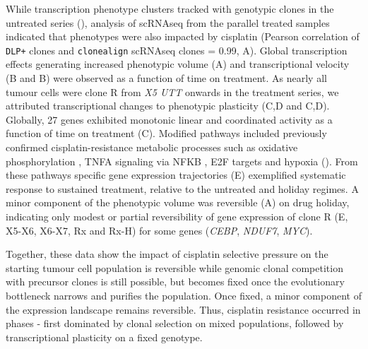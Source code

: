 
While transcription phenotype clusters tracked with genotypic clones in the untreated series (), analysis of scRNAseq from the parallel treated samples indicated that phenotypes were also impacted by cisplatin (Pearson correlation of \texttt{DLP+} clones and \texttt{clonealign} scRNAseq clones = 0.99, A). Global transcription effects generating increased phenotypic volume\cite{Azizi2018-eb} (A) and transcriptional velocity\cite{La_Manno2018-az} (B and B) were observed as a function of time on treatment.  As nearly all tumour cells were clone R from \textit{X5 UTT} onwards in the treatment series, we attributed transcriptional changes to phenotypic plasticity (C,D and C,D). Globally,  27 genes exhibited monotonic linear and coordinated activity as a function of time on treatment (C).
Modified pathways included previously confirmed cisplatin-resistance metabolic processes such as oxidative phosphorylation \cite{lee2017myc}, TNFA signaling via NFKB \cite{lagunas2008nuclear,ito2015down,ryan2019targeting}, E2F targets \cite{zheng2020upregulation} and hypoxia \cite{lee2012hypoxia,mcevoy2015identifying,deben2018hypoxia,li2019erk} (). From these pathways specific gene expression trajectories (E) exemplified systematic response to sustained treatment, relative to the untreated and holiday regimes. A minor component of the phenotypic volume was reversible (A) on drug holiday, indicating only modest or partial reversibility of gene expression of clone R (E, X5-X6, X6-X7, Rx and Rx-H) for some genes (\textit{CEBP}, \textit{NDUF7}, \textit{MYC}).

Together, these data show the impact of cisplatin selective pressure on the starting tumour cell population is reversible while genomic clonal competition with precursor clones is still possible, but becomes fixed once the evolutionary bottleneck narrows and purifies the population. Once fixed, a minor component of the expression landscape remains reversible. Thus, cisplatin resistance occurred in phases - first dominated by clonal selection on mixed populations, followed by transcriptional plasticity on a fixed genotype.



